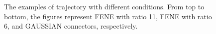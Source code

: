 \documentclass[10pt, a4paper]{article}
\begin{document}
\begin{appendices}
\begin{figure}
      \caption{The examples of trajectory with different conditions. From top to bottom, the figures represent FENE with ratio 11, FENE with ratio 6, and GAUSSIAN connectors, respectively. }
      \label{fig:traj_compare}
    \end{figure}
  

\end{appendices}
\newpage
\printbibliography
\end{document}
